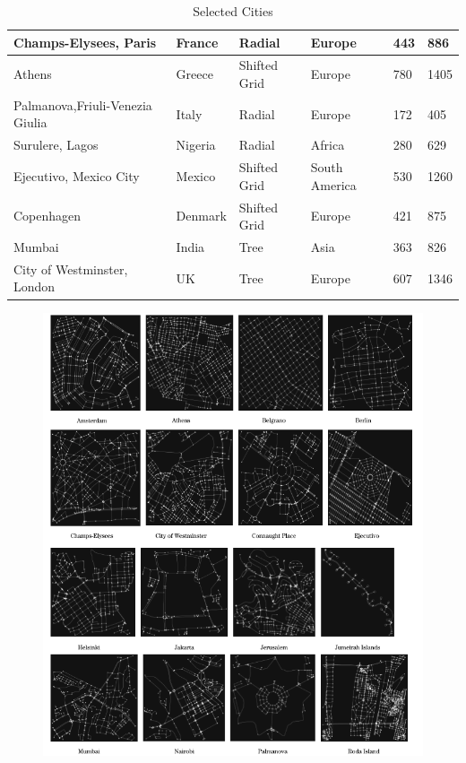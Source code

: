 \begin{landscape}
\begin{table}[]
{\begin{tabular}{|l|l|l|l|l|l|}
Champs-Elysees, Paris           & France      & Radial       & Europe        & 443  & 886  \\ \hline
Athens                          & Greece      & Shifted Grid & Europe        & 780  & 1405 \\ \hline
Palmanova,Friuli-Venezia Giulia & Italy       & Radial       & Europe        & 172  & 405  \\ \hline
Surulere, Lagos                 & Nigeria     & Radial       & Africa        & 280  & 629  \\ \hline
Ejecutivo, Mexico City          & Mexico      & Shifted Grid & South America & 530  & 1260 \\ \hline
Copenhagen                      & Denmark     & Shifted Grid & Europe        & 421  & 875  \\ \hline
Mumbai                          & India       & Tree         & Asia          & 363  & 826  \\ \hline
City of Westminster, London     & UK          & Tree         & Europe        & 607  & 1346 \\ \hline
\end{tabular}%
}
\caption{Selected Cities}
\label{tab:Selected Cities}
\end{table}
\end{landscape}

\begin{figure}[h!]
\centering
\includegraphics[width=1.0\textwidth,center]{picture/Graphs1.png}
\end{figure}


